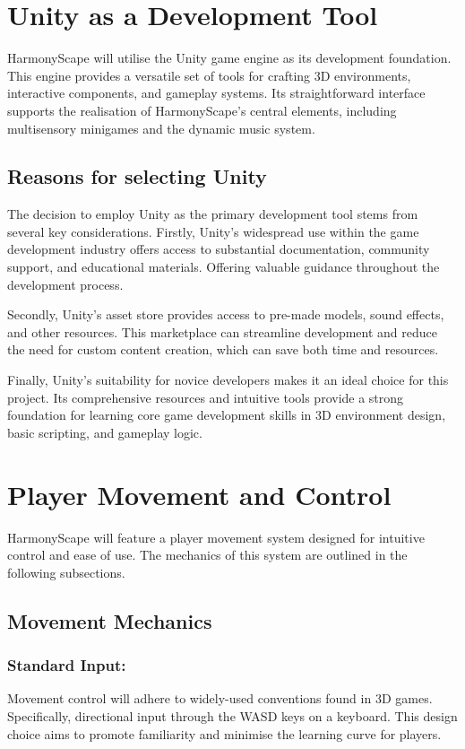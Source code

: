 \documentclass{l4proj}
\begin{document}
\section{Unity as a Development Tool}
HarmonyScape will utilise the Unity game engine as its development foundation. This engine provides a versatile set of tools for crafting 3D environments, interactive components, and gameplay systems. Its straightforward interface supports the realisation of HarmonyScape's central elements, including multisensory minigames and the dynamic music system.

\subsection{Reasons for selecting Unity}
The decision to employ Unity as the primary development tool stems from several key considerations. Firstly, Unity's widespread use within the game development industry offers access to substantial documentation, community support, and educational materials. Offering valuable guidance throughout the development process.

Secondly, Unity's asset store provides access to pre-made models, sound effects, and other resources. This marketplace can streamline development and reduce the need for custom content creation, which can save both time and resources.

Finally, Unity's suitability for novice developers makes it an ideal choice for this project. Its comprehensive resources and intuitive tools provide a strong foundation for learning core game development skills in 3D environment design, basic scripting, and gameplay logic.

\section{Player Movement and Control}\label{sec:move_&_control}
HarmonyScape will feature a player movement system designed for intuitive control and ease of use. The mechanics of this system are outlined in the following subsections.

\subsection{Movement Mechanics}

\subsubsection{Standard Input:} Movement control will adhere to widely-used conventions found in 3D games. Specifically, directional input through the WASD keys on a keyboard. This design choice aims to promote familiarity and minimise the learning curve for players.
\end{document}
